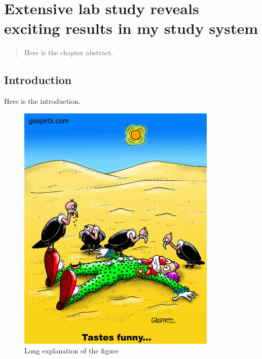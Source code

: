\chapter[Lab study of my population]{Extensive lab study reveals exciting results in my study system}
\label{chap:labstudy}

\begin{abstract}
  Here is the chapter abstract.
\end{abstract}

\section{Introduction}

Here is the introduction.

\begin{figure}[p]
  \centering
  \includegraphics[width=.95\textwidth]{missingdata/figures/Tastes_funny.jpg}%
  \caption[Vultures]{Long explanation of the figure}
  \label{fig:vultures}
\end{figure}

